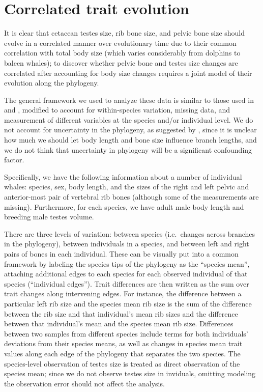\documentclass{article}
\begin{document}
\section{Correlated trait evolution}

It is clear that cetacean testes size, rib bone size, and pelvic bone size
should evolve in a correlated manner over evolutionary time
due to their common correlation with total body size 
(which varies considerably from dolphins to baleen whales);
to discover whether pelvic bone and testes size changes are correlated
after accounting for body size changes
requires a joint model of their evolution along the phylogeny.

The general framework we used to analyze these data is similar to those used in \citet{revell2009phylogenetic} and \citet{harmon2008geiger},
modified to account for within-species variation,
missing data,
and measurement of different variables at the species and/or individual level.
We do not account for uncertainty in the phylogeny,
as suggested by \citet{huelsenbeck2003detecting},
since it is unclear how much we should let body length and bone size influence branch lengths,
and we do not think that uncertainty in phylogeny will be a significant confounding factor.

Specifically, we have the following information about a number of individual whales:
species, sex, body length,
and the sizes of the right and left pelvic and anterior-most pair of vertebral rib bones
(although some of the measurements are missing).
Furthermore, for each species, we have
adult male body length and
breeding male testes volume.

There are three levels of variation:
between species (i.e.\ changes across branches in the phylogeny),
between individuals in a species,
and between left and right pairs of bones in each individual.
These can be visually put into a common framework by 
labeling the species tips of the phylogeny as the ``species mean'',
attaching additional edges to each species for each observed individual of that species (``individual edges'').
Trait differences are then written as the sum over trait changes along intervening edges.
For instance, the difference between a particular left rib size and the species mean rib size
is the sum of the difference between the rib size and that individual's mean rib sizes 
and the difference between that individual's mean and the species mean rib size.
Differences between two samples from different species include terms for both individuals' deviations from their species means,
as well as changes in species mean trait values along each edge of the phylogeny that separates the two species.
The species-level observation of testes size is treated as direct observation of the species mean;
since we do not observe testes size in inviduals, omitting modeling the observation error should not affect the analysis.
\end{document}
